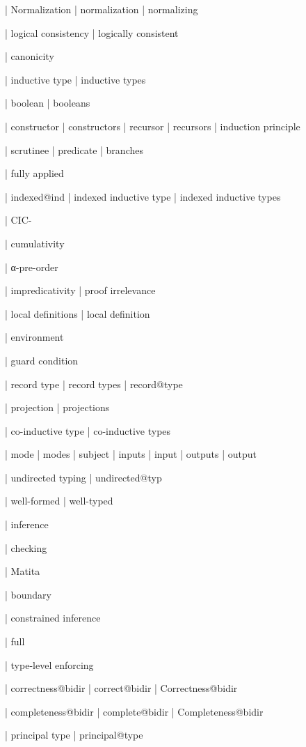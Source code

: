   | Normalization
  | normalization
  | normalizing

  | logical consistency
  | logically consistent

  | canonicity


  | inductive type
  | inductive types

  | boolean
  | booleans

  | constructor
  | constructors
  | recursor
  | recursors
  | induction principle

  | scrutinee
  | predicate
  | branches

  | fully applied

  | indexed@ind
  | indexed inductive type
  | indexed inductive types

  | CIC-


  | cumulativity

  | α-pre-order

  | impredicativity
  | proof irrelevance

  | local definitions
  | local definition

  | environment

  | guard condition

  | record type
  | record types
  | record@type

  | projection
  | projections

  | co-inductive type
  | co-inductive types


  | mode
  | modes
  | subject
  | inputs
  | input
  | outputs
  | output

  | undirected typing
  | undirected@typ


  | well-formed
  | well-typed

  | inference

  | checking

  | Matita

  | boundary

  | constrained inference

  | full

  | type-level enforcing

  | correctness@bidir
  | correct@bidir
  | Correctness@bidir

  | completeness@bidir
  | complete@bidir
  | Completeness@bidir


  | principal type
  | principal@type